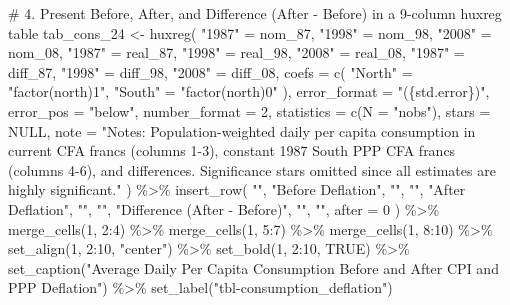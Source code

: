\documentclass[
  letterpaper,
  DIV=11,
  numbers=noendperiod]{scrartcl}
\newenvironment{Shaded}{\begin{snugshade}}{\end{snugshade}}
\newcommand{\AttributeTok}[1]{\textcolor[rgb]{0.40,0.45,0.13}{#1}}
\newcommand{\CommentTok}[1]{\textcolor[rgb]{0.37,0.37,0.37}{#1}}
\newcommand{\ConstantTok}[1]{\textcolor[rgb]{0.56,0.35,0.01}{#1}}
\newcommand{\DecValTok}[1]{\textcolor[rgb]{0.68,0.00,0.00}{#1}}
\newcommand{\FunctionTok}[1]{\textcolor[rgb]{0.28,0.35,0.67}{#1}}
\newcommand{\NormalTok}[1]{\textcolor[rgb]{0.00,0.23,0.31}{#1}}
\newcommand{\OtherTok}[1]{\textcolor[rgb]{0.00,0.23,0.31}{#1}}
\newcommand{\SpecialCharTok}[1]{\textcolor[rgb]{0.37,0.37,0.37}{#1}}
\newcommand{\StringTok}[1]{\textcolor[rgb]{0.13,0.47,0.30}{#1}}
\begin{document}
\begin{Shaded}
\begin{Highlighting}[]
\CommentTok{\# 4. Present Before, After, and Difference (After {-} Before) in a 9{-}column huxreg table}
\NormalTok{tab\_cons\_24 }\OtherTok{\textless{}{-}} \FunctionTok{huxreg}\NormalTok{(}
  \StringTok{"1987"} \OtherTok{=}\NormalTok{ nom\_87,  }\StringTok{"1998"} \OtherTok{=}\NormalTok{ nom\_98,  }\StringTok{"2008"} \OtherTok{=}\NormalTok{ nom\_08,}
  \StringTok{"1987"} \OtherTok{=}\NormalTok{ real\_87, }\StringTok{"1998"} \OtherTok{=}\NormalTok{ real\_98, }\StringTok{"2008"} \OtherTok{=}\NormalTok{ real\_08,}
  \StringTok{"1987"} \OtherTok{=}\NormalTok{ diff\_87, }\StringTok{"1998"} \OtherTok{=}\NormalTok{ diff\_98, }\StringTok{"2008"} \OtherTok{=}\NormalTok{ diff\_08,}
  \AttributeTok{coefs =} \FunctionTok{c}\NormalTok{(}
    \StringTok{"North"} \OtherTok{=} \StringTok{"factor(north)1"}\NormalTok{,}
    \StringTok{"South"} \OtherTok{=} \StringTok{"factor(north)0"}
\NormalTok{  ),}
  \AttributeTok{error\_format =} \StringTok{"(\{std.error\})"}\NormalTok{,}
  \AttributeTok{error\_pos =} \StringTok{"below"}\NormalTok{,}
  \AttributeTok{number\_format =} \DecValTok{2}\NormalTok{,}
  \AttributeTok{statistics =} \FunctionTok{c}\NormalTok{(}\AttributeTok{N =} \StringTok{"nobs"}\NormalTok{),}
  \AttributeTok{stars =} \ConstantTok{NULL}\NormalTok{,}
  \AttributeTok{note =} \StringTok{"Notes: Population{-}weighted daily per capita consumption in current CFA francs (columns 1{-}3), constant 1987 South PPP CFA francs (columns 4{-}6), and differences. Significance stars omitted since all estimates are highly significant."}
\NormalTok{) }\SpecialCharTok{\%\textgreater{}\%}
  \FunctionTok{insert\_row}\NormalTok{(}
    \StringTok{""}\NormalTok{,}
    \StringTok{"Before Deflation"}\NormalTok{, }\StringTok{""}\NormalTok{, }\StringTok{""}\NormalTok{,}
    \StringTok{"After Deflation"}\NormalTok{, }\StringTok{""}\NormalTok{, }\StringTok{""}\NormalTok{,}
    \StringTok{"Difference (After {-} Before)"}\NormalTok{, }\StringTok{""}\NormalTok{, }\StringTok{""}\NormalTok{,}
    \AttributeTok{after =} \DecValTok{0}
\NormalTok{  ) }\SpecialCharTok{\%\textgreater{}\%}
  \FunctionTok{merge\_cells}\NormalTok{(}\DecValTok{1}\NormalTok{, }\DecValTok{2}\SpecialCharTok{:}\DecValTok{4}\NormalTok{) }\SpecialCharTok{\%\textgreater{}\%}
  \FunctionTok{merge\_cells}\NormalTok{(}\DecValTok{1}\NormalTok{, }\DecValTok{5}\SpecialCharTok{:}\DecValTok{7}\NormalTok{) }\SpecialCharTok{\%\textgreater{}\%}
  \FunctionTok{merge\_cells}\NormalTok{(}\DecValTok{1}\NormalTok{, }\DecValTok{8}\SpecialCharTok{:}\DecValTok{10}\NormalTok{) }\SpecialCharTok{\%\textgreater{}\%}
  \FunctionTok{set\_align}\NormalTok{(}\DecValTok{1}\NormalTok{, }\DecValTok{2}\SpecialCharTok{:}\DecValTok{10}\NormalTok{, }\StringTok{"center"}\NormalTok{) }\SpecialCharTok{\%\textgreater{}\%}
  \FunctionTok{set\_bold}\NormalTok{(}\DecValTok{1}\NormalTok{, }\DecValTok{2}\SpecialCharTok{:}\DecValTok{10}\NormalTok{, }\ConstantTok{TRUE}\NormalTok{) }\SpecialCharTok{\%\textgreater{}\%}
  \FunctionTok{set\_caption}\NormalTok{(}\StringTok{"Average Daily Per Capita Consumption Before and After CPI and PPP Deflation"}\NormalTok{) }\SpecialCharTok{\%\textgreater{}\%}
  \FunctionTok{set\_label}\NormalTok{(}\StringTok{"tbl{-}consumption\_deflation"}\NormalTok{)}


\end{Highlighting}
\end{Shaded}
\end{document}
